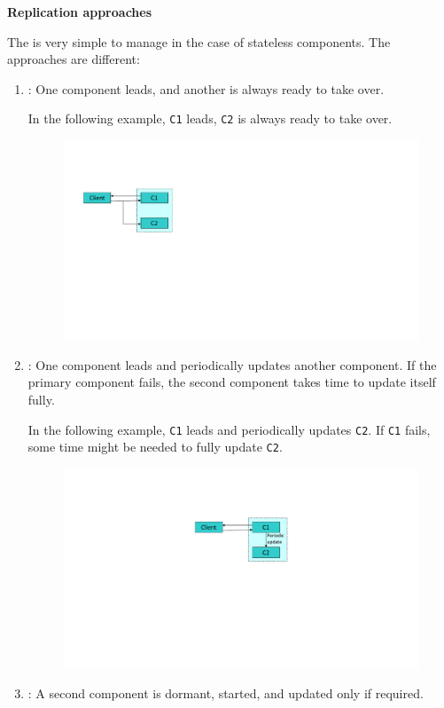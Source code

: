 \begin{flushleft}\label{Replication approaches}
    \textcolor{Red2}{ \textbf{Replication approaches}}
\end{flushleft}
The  is very simple to manage in the case of stateless components. The approaches are different:
\begin{enumerate}
    \item {}: One component leads, and another is always ready to take over.
    
    In the following example, \texttt{C1} leads, \texttt{C2} is always ready to take over.
    \begin{figure}[!htp]
        \centering
        \includegraphics[width=.5\textwidth]{img/replication-1.pdf}
    \end{figure}


    \item {}: One component leads and periodically updates another component. If the primary component fails, the second component takes time to update itself fully.
    
    In the following example, \texttt{C1} leads and periodically updates \texttt{C2}. If \texttt{C1} fails, some time might be needed to fully update \texttt{C2}.
    \begin{figure}[!htp]
        \centering
        \includegraphics[width=.5\textwidth]{img/replication-2.pdf}
    \end{figure}

    \newpage

    \item {}: A second component is dormant, started, and updated only if required.


\end{enumerate}
